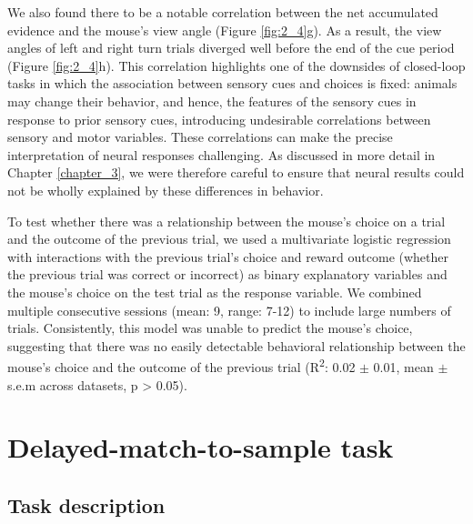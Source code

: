 \bigskip
We also found there to be a notable correlation between the net accumulated evidence and the mouse’s view angle (Figure \ref{fig:2_4}g). As a result, the view angles of left and right turn trials diverged well before the end of the cue period (Figure \ref{fig:2_4}h). This correlation highlights one of the downsides of closed-loop tasks in which the association between sensory cues and choices is fixed: animals may change their behavior, and hence, the features of the sensory cues in response to prior sensory cues, introducing undesirable correlations between sensory and motor variables. These correlations can make the precise interpretation of neural responses challenging. As discussed in more detail in Chapter \ref{chapter_3}, we were therefore careful to ensure that neural results could not be wholly explained by these differences in behavior. 

\bigskip
To test whether there was a relationship between the mouse’s choice on a trial and the outcome of the previous trial, we used a multivariate logistic regression with interactions with the previous trial’s choice and reward outcome (whether the previous trial was correct or incorrect) as binary explanatory variables and the mouse’s choice on the test trial as the response variable. We combined multiple consecutive sessions (mean: 9, range: 7-12) to include large numbers of trials. Consistently, this model was unable to predict the mouse’s choice, suggesting that there was no easily detectable behavioral relationship between the mouse’s choice and the outcome of the previous trial (R\textsuperscript{2}: 0.02 $\pm$ 0.01, mean $\pm$ s.e.m across datasets, p > 0.05). 

\section{Delayed-match-to-sample task} \label{sec:dms}

\subsection{Task description}

